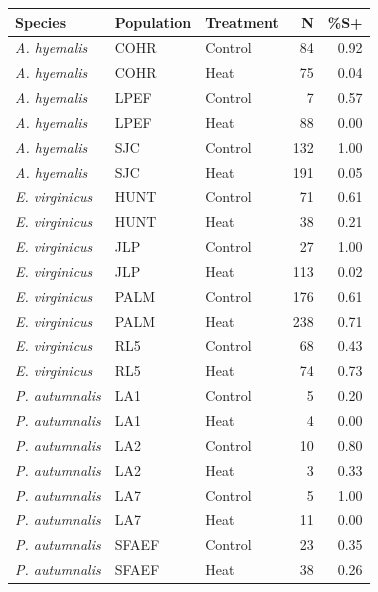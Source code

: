 \begin{tabular}{lllrr}
  \hline
Species & Population & Treatment & N & \%S+ \\ 
  \hline
\textit{A. hyemalis} & COHR & Control &  84 & 0.92 \\ 
  \textit{A. hyemalis} & COHR & Heat &  75 & 0.04 \\ 
  \textit{A. hyemalis} & LPEF & Control &   7 & 0.57 \\ 
  \textit{A. hyemalis} & LPEF & Heat &  88 & 0.00 \\ 
  \textit{A. hyemalis} & SJC & Control & 132 & 1.00 \\ 
  \textit{A. hyemalis} & SJC & Heat & 191 & 0.05 \\ 
  \textit{E. virginicus} & HUNT & Control &  71 & 0.61 \\ 
  \textit{E. virginicus} & HUNT & Heat &  38 & 0.21 \\ 
  \textit{E. virginicus} & JLP & Control &  27 & 1.00 \\ 
  \textit{E. virginicus} & JLP & Heat & 113 & 0.02 \\ 
  \textit{E. virginicus} & PALM & Control & 176 & 0.61 \\ 
  \textit{E. virginicus} & PALM & Heat & 238 & 0.71 \\ 
  \textit{E. virginicus} & RL5 & Control &  68 & 0.43 \\ 
  \textit{E. virginicus} & RL5 & Heat &  74 & 0.73 \\ 
  \textit{P. autumnalis} & LA1 & Control &   5 & 0.20 \\ 
  \textit{P. autumnalis} & LA1 & Heat &   4 & 0.00 \\ 
  \textit{P. autumnalis} & LA2 & Control &  10 & 0.80 \\ 
  \textit{P. autumnalis} & LA2 & Heat &   3 & 0.33 \\ 
  \textit{P. autumnalis} & LA7 & Control &   5 & 1.00 \\ 
  \textit{P. autumnalis} & LA7 & Heat &  11 & 0.00 \\ 
  \textit{P. autumnalis} & SFAEF & Control &  23 & 0.35 \\ 
  \textit{P. autumnalis} & SFAEF & Heat &  38 & 0.26 \\ 
   \hline
\end{tabular}
